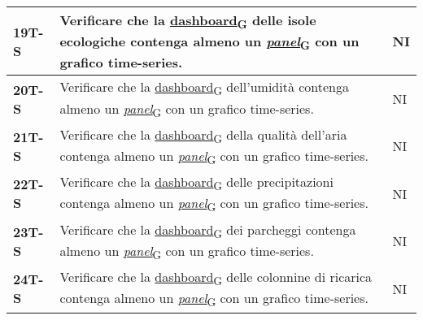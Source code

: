\begin{longtable}{|>{\raggedright\arraybackslash}m{}|>{\raggedright\arraybackslash}m{}|>{\raggedright\arraybackslash}m{}|}
	\hline
	\textbf{19T-S}  & Verificare che la \href{https://7last.github.io/docs/pb/documentazione-interna/glossario\#dashboard}{dashboard\textsubscript{G}} delle isole ecologiche contenga almeno un \href{https://7last.github.io/docs/pb/documentazione-interna/glossario\#panel}{\textit{panel}\textsubscript{G}} con un grafico time-series.                                                                                 & NI             \\
	\hline
	\textbf{20T-S}  & Verificare che la \href{https://7last.github.io/docs/pb/documentazione-interna/glossario\#dashboard}{dashboard\textsubscript{G}} dell'umidità contenga almeno un \href{https://7last.github.io/docs/pb/documentazione-interna/glossario\#panel}{\textit{panel}\textsubscript{G}} con un grafico time-series.                                                                                           & NI             \\
	\hline
	\textbf{21T-S}  & Verificare che la \href{https://7last.github.io/docs/pb/documentazione-interna/glossario\#dashboard}{dashboard\textsubscript{G}} della qualità dell'aria contenga almeno un \href{https://7last.github.io/docs/pb/documentazione-interna/glossario\#panel}{\textit{panel}\textsubscript{G}} con un grafico time-series.                                                                                & NI             \\
	\hline
	\textbf{22T-S}  & Verificare che la \href{https://7last.github.io/docs/pb/documentazione-interna/glossario\#dashboard}{dashboard\textsubscript{G}} delle precipitazioni contenga almeno un \href{https://7last.github.io/docs/pb/documentazione-interna/glossario\#panel}{\textit{panel}\textsubscript{G}} con un grafico time-series.                                                                                   & NI             \\
	\hline
	\textbf{23T-S}  & Verificare che la \href{https://7last.github.io/docs/pb/documentazione-interna/glossario\#dashboard}{dashboard\textsubscript{G}} dei parcheggi contenga almeno un \href{https://7last.github.io/docs/pb/documentazione-interna/glossario\#panel}{\textit{panel}\textsubscript{G}} con un grafico time-series.                                                                                          & NI             \\
	\hline
	\textbf{24T-S}  & Verificare che la \href{https://7last.github.io/docs/pb/documentazione-interna/glossario\#dashboard}{dashboard\textsubscript{G}} delle colonnine di ricarica contenga almeno un \href{https://7last.github.io/docs/pb/documentazione-interna/glossario\#panel}{\textit{panel}\textsubscript{G}} con un grafico time-series.                                                                            & NI             \\

\end{longtable}
